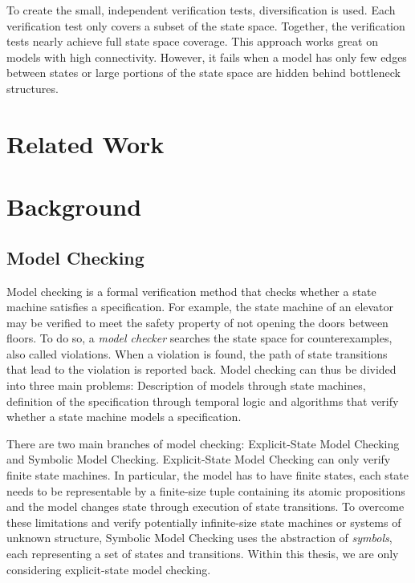 \documentclass[
fancyheadings, %
%
%
]{stsreprt}
\begin{document}

To create the small, independent verification tests, diversification is used.
Each verification test only covers a subset of the state space.
Together, the verification tests nearly achieve full state space coverage.
This approach works great on models with high connectivity.
However, it fails when a model has only few edges between states or large portions of the state space are hidden behind bottleneck structures.

\chapter{Related Work}

\chapter{Background}

\section{Model Checking}

Model checking is a formal verification method that checks whether a state machine satisfies a specification.
For example, the state machine of an elevator may be verified to meet the safety property of not opening the doors between floors.
To do so, a \emph{model checker} searches the state space for counterexamples, also called violations.
When a violation is found, the path of state transitions that lead to the violation is reported back.
Model checking can thus be divided into three main problems:
Description of models through state machines, definition of the specification through temporal logic and algorithms that verify whether a state machine models a specification.

There are two main branches of model checking:
Explicit-State Model Checking and Symbolic Model Checking.
Explicit-State Model Checking can only verify finite state machines.
In particular, the model has to have finite states, each state needs to be representable by a finite-size tuple containing its atomic propositions and the model changes state through execution of state transitions.
To overcome these limitations and verify potentially infinite-size state machines or systems of unknown structure, Symbolic Model Checking uses the abstraction of \emph{symbols}, each representing a set of states and transitions.
Within this thesis, we are only considering explicit-state model checking.
\end{document}
